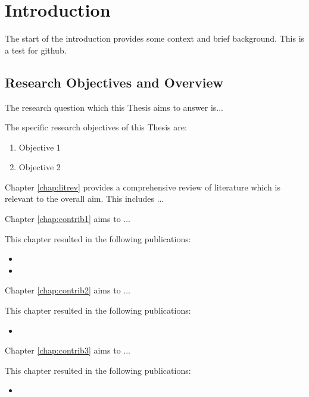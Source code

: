 \chapter{Introduction}\label{chap:intro}

The start of the introduction provides some context and brief background.
This is a test for github.
\section{Research Objectives and Overview}


The research question which this Thesis aims to answer is...


The specific research objectives of this Thesis are:

\begin{enumerate}
\item Objective 1
\item Objective 2
\end{enumerate}

Chapter \ref{chap:litrev} provides a comprehensive review of literature which is relevant to the overall aim. This includes ...

Chapter \ref{chap:contrib1} aims to ...

This chapter resulted in the following publications:

\begin{itemize}
\item {}
\item {}
\end{itemize}

Chapter \ref{chap:contrib2} aims to ...

This chapter resulted in the following publications:

\begin{itemize}
\item {}
\end{itemize}

Chapter \ref{chap:contrib3} aims to ...

This chapter resulted in the following publications:

\begin{itemize}
\item {}
\end{itemize}

